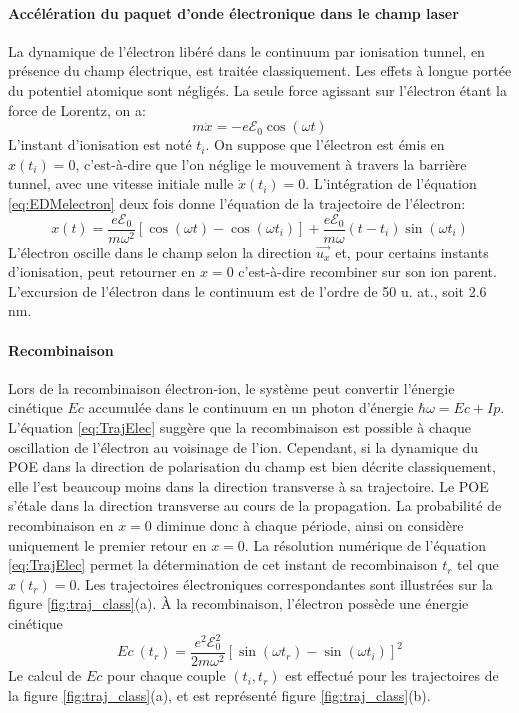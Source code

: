 \paragraph{Accélération du paquet d'onde électronique dans le champ laser} La dynamique de l'électron libéré dans le continuum par ionisation tunnel, en présence du champ électrique, est traitée classiquement. Les effets à longue portée du potentiel atomique sont négligés. La seule force agissant sur l'électron étant la force de Lorentz, on a:
\begin{equation}
m \ddot{x} = -e \mathcal{E}_0 \cos(\omega t)
\label{eq:EDMelectron}
\end{equation} 
L'instant d'ionisation est noté $t_i$. On suppose que l'électron est émis en $x(t_i) = 0$, c'est-à-dire que l'on néglige le mouvement à travers la barrière tunnel, avec une vitesse initiale nulle $\dot{x}(t_i) = 0$. L'intégration de l'équation \ref{eq:EDMelectron} deux fois donne l'équation de la trajectoire de l'électron:
\begin{equation}
x(t) = \frac{e \mathcal{E}_0}{m \omega^2} \left[ \cos(\omega t) - \cos(\omega t_i) \right] + \frac{e \mathcal{E}_0}{m \omega}(t-t_i) \sin(\omega t_i)
\label{eq:TrajElec}
\end{equation}
L'électron oscille dans le champ selon la direction $\vec{u_x}$ et, pour certains instants d'ionisation, peut retourner en $x = 0$ c'est-à-dire recombiner sur son ion parent. L'excursion de l'électron dans le continuum est de l'ordre de 50 u. at., soit 2.6 nm.

\paragraph{Recombinaison} Lors de la recombinaison électron-ion, le système peut convertir l'énergie cinétique $Ec$ accumulée dans le continuum en un photon d'énergie $\hbar \omega = Ec + Ip$. L'équation \ref{eq:TrajElec} suggère que la recombinaison est possible à chaque oscillation de l'électron au voisinage de l'ion. Cependant, si la dynamique du POE dans la direction de polarisation du champ est bien décrite classiquement, elle l'est beaucoup moins dans la direction transverse à sa trajectoire. Le POE s'étale dans la direction transverse au cours de la propagation. La probabilité de recombinaison en $x = 0$ diminue donc à chaque période, ainsi on considère uniquement le premier retour en $x = 0$. La résolution numérique de l'équation \ref{eq:TrajElec} permet la détermination de cet instant de recombinaison $t_r$ tel que $x(t_r) = 0$. Les trajectoires électroniques correspondantes sont illustrées sur la figure \ref{fig:traj_class}(a). \`{A} la recombinaison, l'électron possède une énergie cinétique
\begin{equation}
Ec \: (t_r) = \frac{e^2 \mathcal{E}_0^2}{2m\omega^2} \left[ \sin(\omega t_r) - \sin(\omega t_i) \right]^2
\end{equation}
Le calcul de $Ec$ pour chaque couple $(t_i, t_r)$ est effectué pour les trajectoires de la figure \ref{fig:traj_class}(a), et est représenté figure \ref{fig:traj_class}(b). 

